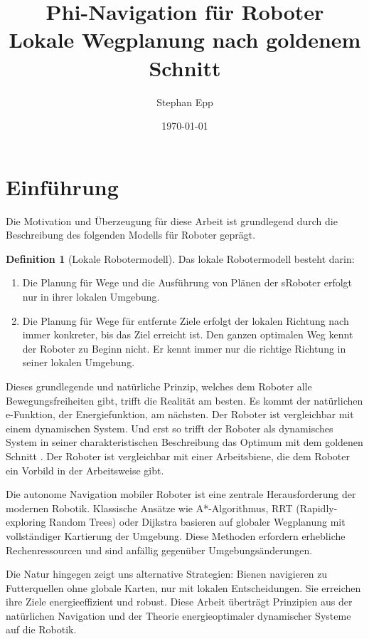 ﻿\documentclass[a4paper,12pt]{article}
\title{Phi-Navigation für Roboter\\
	\large Lokale Wegplanung nach goldenem Schnitt}
\author{Stephan Epp}
\date{\today}
\theoremstyle{definition}
\newtheorem{definition}{Definition}
\begin{document}
	
\maketitle
\tableofcontents
\newpage

\section{Einführung}
Die Motivation und Überzeugung für diese Arbeit ist grundlegend durch die Beschreibung des folgenden Modells für Roboter geprägt.

\begin{definition}[Lokale Robotermodell]
Das lokale Robotermodell besteht darin:
\begin{enumerate}
	\item Die Planung für Wege und die Ausführung von Plänen der sRoboter erfolgt nur in ihrer lokalen Umgebung.
	\item Die Planung für Wege für entfernte Ziele erfolgt der lokalen Richtung nach immer konkreter, bis das Ziel erreicht ist. Den ganzen optimalen Weg kennt der Roboter zu Beginn nicht. Er kennt immer nur die richtige Richtung in seiner lokalen Umgebung.
\end{enumerate}	
\end{definition}

Dieses grundlegende und natürliche Prinzip, welches dem Roboter alle Bewegungsfreiheiten gibt, trifft die Realität am besten. Es kommt der natürlichen e-Funktion, der Energiefunktion, am nächsten. Der Roboter ist vergleichbar mit einem dynamischen System. Und erst so trifft der Roboter als dynamisches System in seiner charakteristischen Beschreibung das Optimum mit dem goldenen Schnitt \cite{phi_energy}. Der Roboter ist vergleichbar mit einer Arbeitsbiene, die dem Roboter ein Vorbild in der Arbeitsweise gibt.

Die autonome Navigation mobiler Roboter ist eine zentrale Herausforderung der modernen Robotik. Klassische Ansätze wie A*-Algorithmus, RRT (Rapidly-exploring Random Trees) oder Dijkstra basieren auf globaler Wegplanung mit vollständiger Kartierung der Umgebung. Diese Methoden erfordern erhebliche Rechenressourcen und sind anfällig gegenüber Umgebungsänderungen.

Die Natur hingegen zeigt uns alternative Strategien: Bienen navigieren zu Futterquellen ohne globale Karten, nur mit lokalen Entscheidungen. Sie erreichen ihre Ziele energieeffizient und robust. Diese Arbeit überträgt Prinzipien aus der natürlichen Navigation und der Theorie energieoptimaler dynamischer Systeme auf die Robotik.
\end{document}
